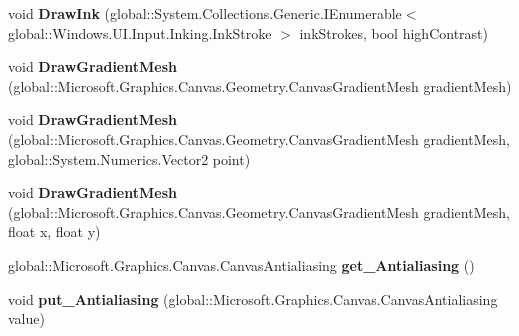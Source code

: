 \begin{DoxyCompactItemize}
\item 
\mbox{\label{interface_microsoft_1_1_graphics_1_1_canvas_1_1_i_canvas_drawing_session_a6566b642a6f05aee158005f6050d913b}} 
void {\bfseries Draw\+Ink} (global\+::\+System.\+Collections.\+Generic.\+I\+Enumerable$<$ global\+::\+Windows.\+U\+I.\+Input.\+Inking.\+Ink\+Stroke $>$ ink\+Strokes, bool high\+Contrast)
\item 
\mbox{\label{interface_microsoft_1_1_graphics_1_1_canvas_1_1_i_canvas_drawing_session_aba72846c2319ebafdd0c9e33d94eb145}} 
void {\bfseries Draw\+Gradient\+Mesh} (global\+::\+Microsoft.\+Graphics.\+Canvas.\+Geometry.\+Canvas\+Gradient\+Mesh gradient\+Mesh)
\item 
\mbox{\label{interface_microsoft_1_1_graphics_1_1_canvas_1_1_i_canvas_drawing_session_ac32f1e75cff1b963f51f956c403b34e8}} 
void {\bfseries Draw\+Gradient\+Mesh} (global\+::\+Microsoft.\+Graphics.\+Canvas.\+Geometry.\+Canvas\+Gradient\+Mesh gradient\+Mesh, global\+::\+System.\+Numerics.\+Vector2 point)
\item 
\mbox{\label{interface_microsoft_1_1_graphics_1_1_canvas_1_1_i_canvas_drawing_session_ad88ff48a111df7cba618ec22b1f9e550}} 
void {\bfseries Draw\+Gradient\+Mesh} (global\+::\+Microsoft.\+Graphics.\+Canvas.\+Geometry.\+Canvas\+Gradient\+Mesh gradient\+Mesh, float x, float y)
\item 
\mbox{\label{interface_microsoft_1_1_graphics_1_1_canvas_1_1_i_canvas_drawing_session_a1fb286e37c6e25838689dcfc89c54256}} 
global\+::\+Microsoft.\+Graphics.\+Canvas.\+Canvas\+Antialiasing {\bfseries get\+\_\+\+Antialiasing} ()
\item 
\mbox{\label{interface_microsoft_1_1_graphics_1_1_canvas_1_1_i_canvas_drawing_session_a1ed0f4918d2b7f4236c60a91533f699c}} 
void {\bfseries put\+\_\+\+Antialiasing} (global\+::\+Microsoft.\+Graphics.\+Canvas.\+Canvas\+Antialiasing value)

\end{DoxyCompactItemize}
